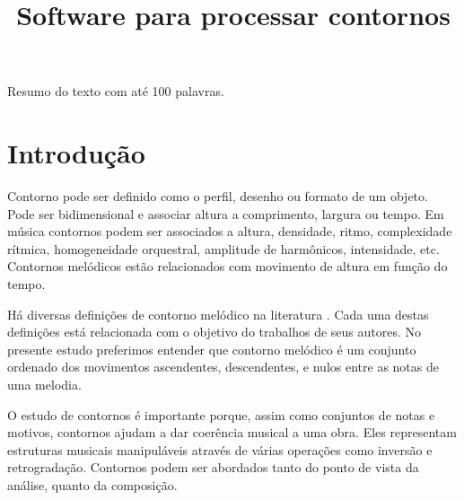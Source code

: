 \documentclass[brazil]{article}
\begin{document}
\graphicspath{{figs-out/}{out/}}

\title{Software para processar contornos}
\author{}{}{}{}

\begin{sumario}
  Resumo do texto com até 100 palavras.  
\end{sumario}








\section{Introdução}
\label{sec:introducao}

Contorno pode ser definido como o perfil, desenho ou formato de um
objeto. Pode ser bidimensional e associar altura a comprimento,
largura ou tempo. Em música contornos podem ser associados a altura,
densidade, ritmo, complexidade rítmica, homogeneidade orquestral,
amplitude de harmônicos, intensidade, etc. Contornos melódicos estão
relacionados com movimento de altura em função do tempo.

Há diversas definições de contorno melódico na literatura
\cite{piston59:harmony,toch77:shaping,schonberg:fundamentals,adams76:melodic,marvin.ea87:relating,morris87:composition,clifford95:contour,beard03:contour}. Cada
uma destas definições está relacionada com o objetivo do trabalhos de
seus autores. No presente estudo preferimos entender que contorno
melódico é um conjunto ordenado dos movimentos ascendentes,
descendentes, e nulos entre as notas de uma melodia.


O estudo de contornos é importante porque, assim como conjuntos de
notas e motivos, contornos ajudam a dar coerência musical a uma
obra. Eles representam estruturas musicais manipuláveis através de
várias operações como inversão e retrogradação. Contornos podem ser
abordados tanto do ponto de vista da análise, quanto da composição.
\end{document}
